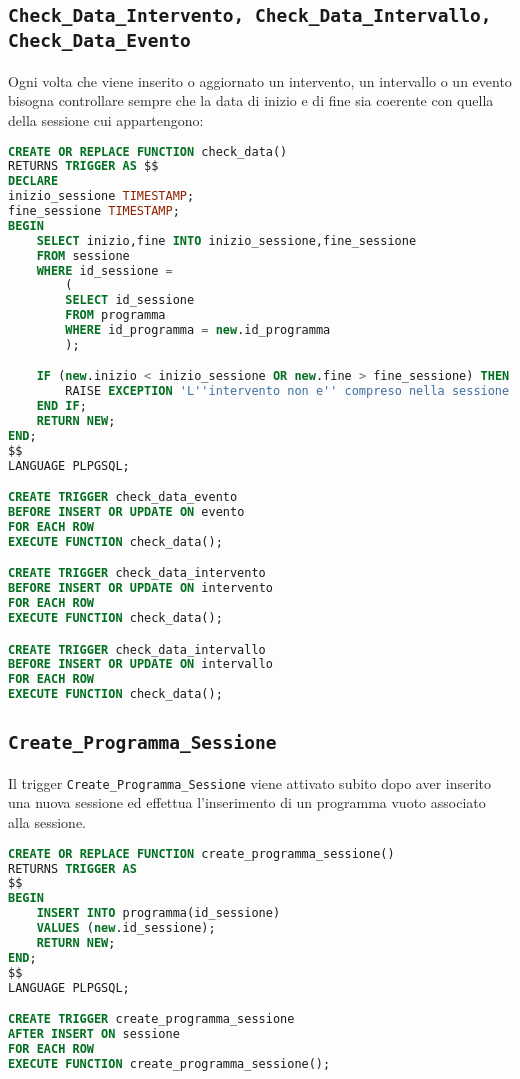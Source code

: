\subsection{\texttt{Check\_Data\_Intervento, Check\_Data\_Intervallo, Check\_Data\_Evento}}\label{trigger:check_data}
Ogni volta che viene inserito o aggiornato un intervento, un intervallo o un evento bisogna controllare sempre che la data di inizio e di fine sia coerente con quella della sessione cui appartengono:
\begin{lstlisting}[caption={check\_data\_intervento},language=SQL,style=mystyle]
CREATE OR REPLACE FUNCTION check_data() 
RETURNS TRIGGER AS $$
DECLARE
inizio_sessione TIMESTAMP;
fine_sessione TIMESTAMP;
BEGIN
	SELECT inizio,fine INTO inizio_sessione,fine_sessione
	FROM sessione
	WHERE id_sessione = 
		(
		SELECT id_sessione 
		FROM programma
		WHERE id_programma = new.id_programma
		);

	IF (new.inizio < inizio_sessione OR new.fine > fine_sessione) THEN
		RAISE EXCEPTION 'L''intervento non e'' compreso nella sessione';
	END IF;
	RETURN NEW;
END;
$$ 
LANGUAGE PLPGSQL;

CREATE TRIGGER check_data_evento
BEFORE INSERT OR UPDATE ON evento
FOR EACH ROW
EXECUTE FUNCTION check_data();

CREATE TRIGGER check_data_intervento
BEFORE INSERT OR UPDATE ON intervento
FOR EACH ROW
EXECUTE FUNCTION check_data();

CREATE TRIGGER check_data_intervallo
BEFORE INSERT OR UPDATE ON intervallo
FOR EACH ROW
EXECUTE FUNCTION check_data();
\end{lstlisting}
\subsection{\texttt{Create\_Programma\_Sessione}}
Il trigger \texttt{Create\_Programma\_Sessione} viene attivato subito dopo aver inserito una nuova sessione ed effettua l'inserimento di un programma vuoto associato alla sessione.
\begin{lstlisting}[language=SQL, caption={\texttt{create\_programma\_sessione}},style=mystyle]
CREATE OR REPLACE FUNCTION create_programma_sessione() 
RETURNS TRIGGER AS 
$$
BEGIN
	INSERT INTO programma(id_sessione) 
	VALUES (new.id_sessione);
	RETURN NEW;
END;
$$ 
LANGUAGE PLPGSQL;

CREATE TRIGGER create_programma_sessione
AFTER INSERT ON sessione
FOR EACH ROW
EXECUTE FUNCTION create_programma_sessione();
\end{lstlisting}
